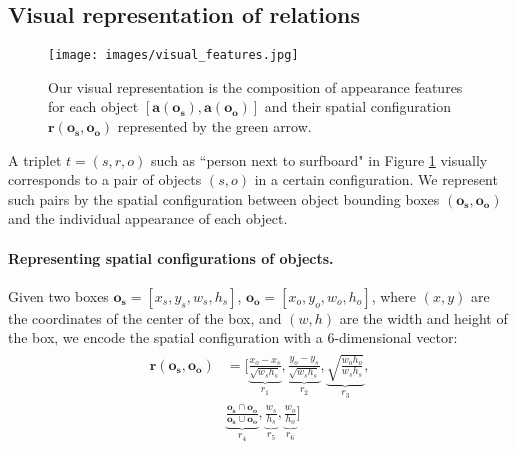 \documentclass[10pt,twocolumn,letterpaper]{article}
\newcommand{\spaceparagraph}{\vspace{-.35cm}}
\begin{document}
\subsection{Visual representation of relations}
\label{visual_representation}

\begin{figure}[t]
	\begin{center}
   	\texttt{[image: images/visual\_features.jpg]}
	\end{center}
	\setlength\abovecaptionskip{-5pt}
   	\caption{Our visual representation is the composition of appearance features for each object $[\bm{a}(\bm{o_s}), \bm{a}(\bm{o_o})]$ and their spatial configuration $\bm{r}(\bm{o_s},\bm{o_o})$ represented by the green arrow.}
   	\vspace{-.4cm}
	\label{fig:visual_representation}
\end{figure}

A triplet $t=(s,r,o)$ such as ``person next to surfboard" in Figure \ref{fig:visual_representation} visually corresponds to a pair of objects $(s,o)$ in a certain configuration. We represent such pairs by the spatial configuration between object bounding boxes $(\bm{o_s},\bm{o_o})$ and the individual appearance of each object. 

\spaceparagraph
\paragraph{Representing spatial configurations of objects.} Given two boxes $\bm{o_s} = [x_{s}, y_{s}, w_s, h_s]$, $\bm{o_o} = [x_{o}, y_{o}, w_o, h_o]$, where $(x, y)$ are the coordinates of the center of the box, and $(w,h)$ are the width and height of the box, we encode the spatial configuration with a 6-dimensional vector:
\vspace{-2pt}
\begin{align}
\label{eq:spatial}
\begin{split}
\bm{r}(\bm{o_s},\bm{o_o})& = [\underbrace{\frac{x_{o}-x_{s}}{\sqrt{w_s h_s}}}_{r_1}, \underbrace{\frac{y_{o}-y_{s}}{\sqrt{w_s h_s}}}_{r_2}, \underbrace{\sqrt{\frac{w_o h_o}{w_s h_s}}}_{r_3}, \\
&\underbrace{\frac{\bm{o_s} \cap \bm{o_o}}{\bm{o_s} \cup \bm{o_o}}}_{r_4}, \underbrace{\frac{w_s}{h_s}}_{r_5}, \underbrace{\frac{w_o}{h_o}}_{r_6}]
\end{split}
\end{align}
 
\end{document}
